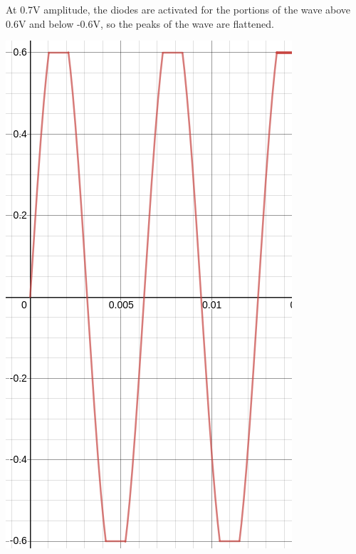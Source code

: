\documentclass{article}
\begin{document}
At 0.7V amplitude, the diodes are activated for the portions of the wave above 0.6V and below -0.6V, so the peaks of the wave are flattened.
\begin{center}
\includegraphics[scale=.5]{plot2.png}
\end{center}
\end{document}
